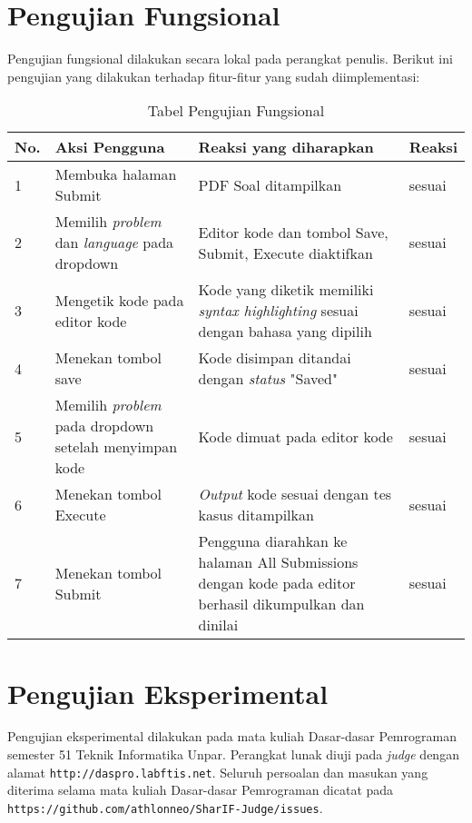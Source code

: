 \section{Pengujian Fungsional}
\label{sec:5:fungsional}

Pengujian fungsional dilakukan secara lokal pada perangkat penulis. Berikut ini pengujian yang dilakukan terhadap fitur-fitur yang sudah diimplementasi:

\begin{table}[H]
	\centering
	\caption{Tabel Pengujian Fungsional}
	\begin{tabular}{|p{0.5cm}| p{5.5cm}| p{6cm}| p{2.5cm}|} \hline
	No.	&	Aksi Pengguna	&	Reaksi yang diharapkan	&	Reaksi \\ \hline
	1 	&  Membuka halaman Submit & PDF Soal ditampilkan &	sesuai	\\ \hline
	2 	&  Memilih \textit{problem} dan \textit{language} pada dropdown & Editor kode dan tombol Save, Submit, Execute diaktifkan &	sesuai	\\ \hline
	3 	&  Mengetik kode pada editor kode & Kode yang diketik memiliki \textit{syntax highlighting} sesuai dengan bahasa yang dipilih &	sesuai	\\ \hline
	4 	&  Menekan tombol save & Kode disimpan ditandai dengan \textit{status} "Saved" &	sesuai	\\ \hline
	5 	&  Memilih \textit{problem} pada dropdown setelah menyimpan kode & Kode dimuat pada editor kode &	sesuai	\\ \hline
	6 	&  Menekan tombol Execute & \textit{Output} kode sesuai dengan tes kasus ditampilkan &	sesuai	\\ \hline
	7 	&  Menekan tombol Submit & Pengguna diarahkan ke halaman All Submissions dengan kode pada editor berhasil dikumpulkan dan dinilai  &	sesuai	\\ \hline
	\end{tabular}
	\label{table:fungsional}
\end{table}


\section{Pengujian Eksperimental}
\label{sec:5:eksperimental}

Pengujian eksperimental dilakukan pada mata kuliah Dasar-dasar Pemrograman semester 51 Teknik Informatika Unpar. Perangkat lunak diuji pada \textit{judge} dengan alamat \verb|http://daspro.labftis.net|. Seluruh persoalan dan masukan yang diterima selama mata kuliah Dasar-dasar Pemrograman dicatat pada \verb|https://github.com/athlonneo/SharIF-Judge/issues|.

